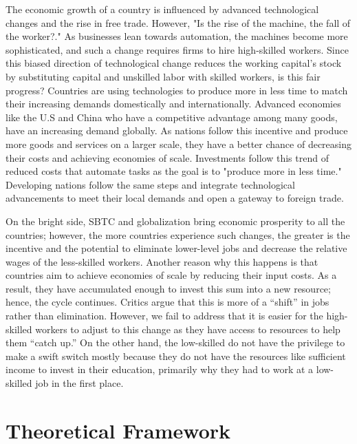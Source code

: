 \hspace{20pt}The economic growth of a country is influenced by advanced technological changes and the rise in free trade. However, "Is the rise of the machine, the fall of the worker?." As businesses lean towards automation, the machines become more sophisticated, and such a change requires firms to hire high-skilled workers. Since this biased direction of technological change reduces the working capital's stock by substituting capital and unskilled labor with skilled workers, is this fair progress? Countries are using technologies to produce more in less time to match their increasing demands domestically and internationally. Advanced economies like the U.S and China who have a competitive advantage among many goods, have an increasing demand globally. As nations follow this incentive and produce more goods and services on a larger scale, they have a better chance of decreasing their costs and achieving economies of scale. Investments follow this trend of reduced costs that automate tasks as the goal is to "produce more in less time." Developing nations follow the same steps and integrate technological advancements to meet their local demands and open a gateway to foreign trade.

On the bright side, SBTC and globalization bring economic prosperity to all the countries; however, the more countries experience such changes, the greater is the incentive and the potential to eliminate lower-level jobs and decrease the relative wages of the less-skilled workers. Another reason why this happens is that countries aim to achieve economies of scale by reducing their input costs. As a result, they have accumulated enough to invest this sum into a new resource; hence, the cycle continues. Critics argue that this is more of a “shift” in jobs rather than elimination. However, we fail to address that it is easier for the high-skilled workers to adjust to this change as they have access to resources to help them “catch up.” On the other hand, the low-skilled do not have the privilege to make a swift switch mostly because they do not have the resources like sufficient income to invest in their education, primarily why they had to work at a low-skilled job in the first place.


\section{Theoretical Framework}

